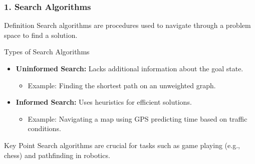 \documentclass[aspectratio=169]{beamer}
\begin{document}
\begin{frame}[fragile]
    \frametitle{1. Search Algorithms}
    \begin{block}{Definition}
        Search algorithms are procedures used to navigate through a problem space to find a solution.
    \end{block}
    
    \begin{block}{Types of Search Algorithms}
        \begin{itemize}
            \item \textbf{Uninformed Search:} Lacks additional information about the goal state.
                \begin{itemize}
                    \item Example: Finding the shortest path on an unweighted graph.
                \end{itemize}
            \item \textbf{Informed Search:} Uses heuristics for efficient solutions.
                \begin{itemize}
                    \item Example: Navigating a map using GPS predicting time based on traffic conditions.
                \end{itemize}
        \end{itemize}
    \end{block}
    
    \begin{block}{Key Point}
        Search algorithms are crucial for tasks such as game playing (e.g., chess) and pathfinding in robotics.
    \end{block}
\end{frame}
\end{document}
